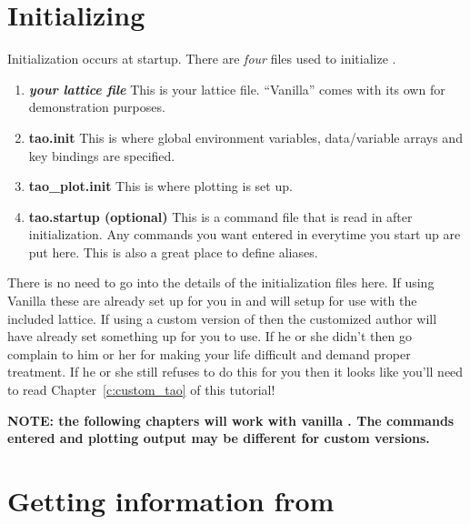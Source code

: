 \section{Initializing \tao}
\label{s:initializing}

Initialization occurs at startup. There are \emph{four} files used to initialize \tao.
  \vspace*{-3ex}
\begin{enumerate}
  \item \textbf{\textit{your lattice file}} \Newline
    This is your lattice file. ``Vanilla'' \tao comes with its own for
demonstration purposes.
  \item \textbf{tao.init} \Newline 
    This is where global environment variables, data/variable
arrays and key bindings are specified.
  \item \textbf{tao\_plot.init} \Newline
    This is where plotting is set up.
  \item \textbf{tao.startup (optional)} \Newline
    This is a command file that is read in after initialization. Any commands you
want entered in \tao everytime you start up are put here. This is also a great
place to define aliases.
\end{enumerate}

There is no need to go into the details of the initialization files here. If
using Vanilla \tao these are already set up for you in  and will
setup \tao for use with the included \cesr lattice. If
using a custom version of \tao then the customized \tao author will have already set something
up for you to use. If he or she didn't then go complain to him or her for making
your life difficult and demand proper treatment. If he or she still refuses to
do this for you then it looks like you'll need to read Chapter~\ref{c:custom_tao}
of this tutorial!

\textbf{NOTE: the following chapters will work with vanilla \tao. The commands
entered and plotting output may be different for custom versions.}


\section{Getting information from \tao}
\label{s:get_info}

